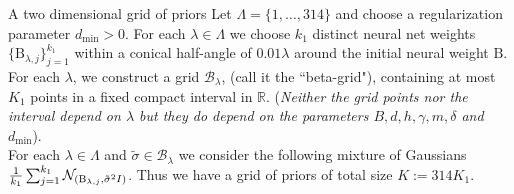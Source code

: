 \documentclass[final,t]{beamer}
\newcommand\R{\mathbb{R}}
\newcommand{\B}{\textrm{B}}
\begin{document}
\begin{frame}[containsverbatim]
\begin{columns}[t]
\begin{column}{.32\linewidth}
\vspace{-18mm}







\begin{exampleblock}{A two dimensional grid of priors}
  Let $\Lambda = \{1,\ldots,314\}$ and choose a regularization parameter $d_{\min} >0$. For each $\lambda \in \Lambda$ we choose $k_1$ distinct neural net weights $\{ \B_{\lambda,j} \}_{j=1}^{k_1}$ within a conical half-angle of $0.01\lambda$ around the initial neural weight $\B$. 
\newline \\ 
For each $\lambda$, we construct a grid $\mathcal{B}_\lambda$, (call it  the ``beta-grid"), containing at most $K_1$ points in a fixed compact interval in $\R$. ({\it Neither the grid points nor the interval depend on $\lambda$ but they do depend on the parameters $B,d,h,\gamma,m,\delta$ and $d_{\min}$}). 
  \newline \\ 
  For each $\lambda \in \Lambda$ and $\tilde{\sigma} \in \mathcal{B}_\lambda$ we consider the following mixture of Gaussians $\frac{1}{k_1}\sum_{j=1}^{k_1}  {\cal N}_{(\B_{\lambda,j},\tilde{\sigma}^2 I)}$.  Thus we have a grid of priors of total size $K := 314K_1$.
\end{exampleblock}




\end{column}
\end{columns}
\end{frame}
\end{document}
